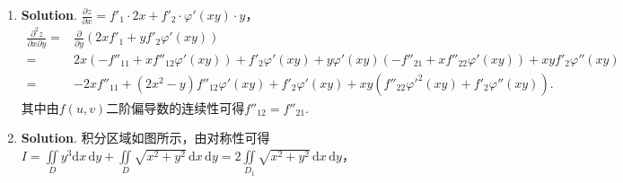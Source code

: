 \documentclass[../Main.tex]{subfiles}
\begin{document}
\begin{enumerate}
    \item \textbf{Solution}. $\frac{\partial z}{\partial x}=f'_{1}\cdot 2x+f'_{2}
              \cdot \varphi'(xy)\cdot y$，
          \[
              \begin{aligned}
                  \frac{\partial^2 z}{\partial x \partial y}= & \frac{\partial}{\partial y}\left(2xf'_{1} + yf'_{2}\varphi'(xy)\right)                                                                                \\
                  =                                           & 2x\left(-f''_{11}+xf''_{12}\varphi'(xy)\right)+f'_{2}\varphi'(xy) + y\varphi'(xy)\left(-f''_{21}+xf''_{22}\varphi'(xy)\right) + xyf'_{2}\varphi''(xy) \\
                  =                                           & -2xf''_{11}+\left(2x^{2}-y\right)f''_{12}\varphi'(xy)+f'_{2}\varphi'(xy)+xy\left(f''_{22}\varphi'^{2}(xy)+f'_{2}\varphi''(xy)\right).
              \end{aligned}
          \]
          其中由$f(u,v)$二阶偏导数的连续性可得$f''_{12}=f''_{21}$.

    \item \textbf{Solution}. 积分区域如图所示，由对称性可得$I=\iint\limits_{D}y^{3}
              \mathrm{d}x\,\mathrm{d}y+\iint\limits_{D}\sqrt{x^{2}+y^{2}}\,\mathrm{d}x\,\mathrm{d}
              y = 2\iint\limits_{D_1}\sqrt{x^{2}+y^{2}}\,\mathrm{d}x\,\mathrm{d}y$，


\end{enumerate}
\end{document}
